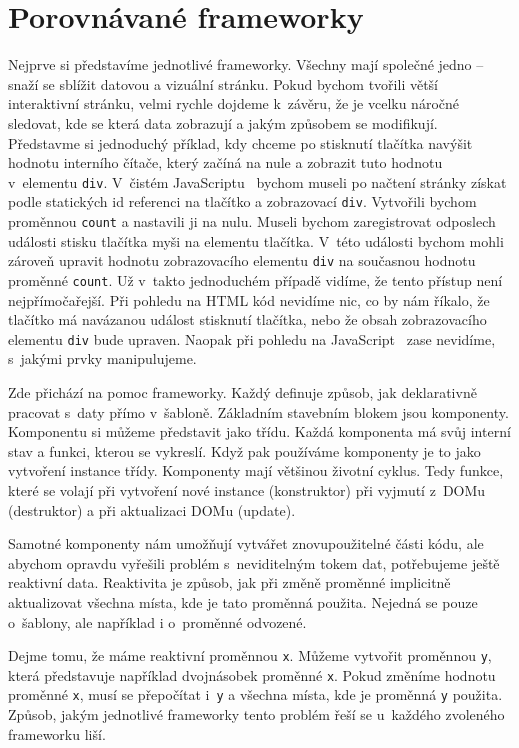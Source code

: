 \documentclass[
  master,
  program=ainf,
  printversion,
  tables=false,
  sourcecodes,
  glossaries,
  index
]{kidiplom}
\begin{document}
\newpage
\section{Porovnávané frameworky}
Nejprve si představíme jednotlivé frameworky. Všechny mají společné jedno --
snaží se sblížit datovou a vizuální stránku. Pokud bychom tvořili větší
interaktivní stránku, velmi rychle dojdeme k~závěru, že je vcelku náročné
sledovat, kde se která data zobrazují a jakým způsobem se modifikují. Představme
si jednoduchý příklad, kdy chceme po stisknutí tlačítka navýšit hodnotu
interního čítače, který začíná na nule a zobrazit tuto hodnotu v~elementu {\tt div}. V~čistém
JavaScriptu~\cite{js} bychom museli po načtení stránky získat podle statických id
referenci na tlačítko a zobrazovací {\tt div}. Vytvořili bychom proměnnou {\tt count} a
nastavili ji na nulu. Museli bychom zaregistrovat odposlech události stisku
tlačítka myši na elementu tlačítka. V~této události bychom mohli zároveň
upravit hodnotu zobrazovacího elementu {\tt div} na současnou hodnotu proměnné {\tt count}. Už
v~takto jednoduchém případě vidíme, že tento přístup není nejpřímočařejší.
Při pohledu na HTML kód nevidíme nic, co by nám říkalo, že tlačítko má navázanou
událost stisknutí tlačítka, nebo že obsah zobrazovacího elementu {\tt div} bude upraven.
Naopak při pohledu na JavaScript~\cite{js} zase nevidíme, s~jakými prvky manipulujeme.

Zde přichází na pomoc frameworky. Každý definuje způsob, jak deklarativně
pracovat s~daty přímo v~šabloně. Základním stavebním blokem jsou komponenty.
Komponentu si můžeme představit jako třídu. Každá komponenta má svůj interní
stav a funkci, kterou se vykreslí. Když pak používáme komponenty je to jako
vytvoření instance třídy. Komponenty mají většinou životní cyklus. Tedy funkce,
které se volají při vytvoření nové instance (konstruktor) při vyjmutí z~DOMu
(destruktor) a při aktualizaci DOMu (update).

Samotné komponenty nám umožňují vytvářet znovupoužitelné části kódu, ale
abychom opravdu vyřešili problém s~neviditelným tokem dat, potřebujeme ještě
reaktivní data. Reaktivita je způsob, jak při změně proměnné implicitně
aktualizovat všechna místa, kde je tato proměnná použita. Nejedná se pouze
o~šablony, ale například i o~proměnné odvozené. 

Dejme tomu, že máme reaktivní proměnnou {\tt x}. Můžeme vytvořit proměnnou {\tt y}, která
představuje například dvojnásobek proměnné {\tt x}. Pokud změníme hodnotu proměnné {\tt x},
musí se přepočítat i~{\tt y} a všechna místa, kde je proměnná {\tt y} použita. Způsob, jakým
jednotlivé frameworky tento problém řeší se u~každého zvoleného frameworku liší.
\end{document}
